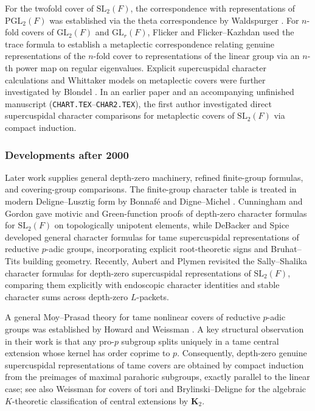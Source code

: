 \documentclass[12pt, letterpaper]{article}
\numberwithin{equation}{section}
\theoremstyle{definition}
\theoremstyle{remark}
\newcommand{\G}{\mathrm{SL}_2(F)}
\begin{document}
For the twofold cover of $\G$, the correspondence with representations of $\mathrm{PGL}_2(F)$ was established via the theta correspondence by Waldspurger \cite{Wa80,Wa91}. For $n$-fold covers of $\mathrm{GL}_2(F)$ and $\mathrm{GL}_r(F)$, Flicker \cite{Fl80} and Flicker--Kazhdan \cite{FK86} used the trace formula to establish a metaplectic correspondence relating genuine representations of the $n$-fold cover to representations of the linear group via an $n$-th power map on regular eigenvalues. Explicit supercuspidal character calculations and Whittaker models on metaplectic covers were further investigated by Blondel \cite{Bl85}. In an earlier paper \cite{Jo99} and an accompanying unfinished manuscript (\texttt{CHART.TEX}--\texttt{CHAR2.TEX}), the first author investigated direct supercuspidal character comparisons for metaplectic covers of $\G$ via compact induction.

\subsubsection{Developments after 2000}

Later work supplies general depth-zero machinery, refined finite-group formulas, and covering-group comparisons. The finite-group character table is treated in modern Deligne--Lusztig form by Bonnaf\'e \cite[Ch.~5, Table~5.4]{Bo11} and Digne--Michel \cite[Ch.~12 and \S 15.9]{DM20}. Cunningham and Gordon \cite{CG09} gave motivic and Green-function proofs of depth-zero character formulas for $\G$ on topologically unipotent elements, while DeBacker and Spice \cite{DS18} developed general character formulas for tame supercuspidal representations of reductive $p$-adic groups, incorporating explicit root-theoretic signs and Bruhat--Tits building geometry. Recently, Aubert and Plymen \cite{AP24} revisited the Sally--Shalika character formulas for depth-zero supercuspidal representations of $\G$, comparing them explicitly with endoscopic character identities and stable character sums across depth-zero $L$-packets.

A general Moy--Prasad theory for tame nonlinear covers of reductive $p$-adic groups was established by Howard and Weissman \cite{HW09}. A key structural observation in their work \cite[Prop.~2.3]{HW09} is that any pro-$p$ subgroup splits uniquely in a tame central extension whose kernel has order coprime to $p$. Consequently, depth-zero genuine supercuspidal representations of tame covers are obtained by compact induction from the preimages of maximal parahoric subgroups, exactly parallel to the linear case; see also Weissman \cite{We09} for covers of tori and Brylinski--Deligne \cite{BD01} for the algebraic $K$-theoretic classification of central extensions by $\mathbf{K}_2$.
\end{document}
